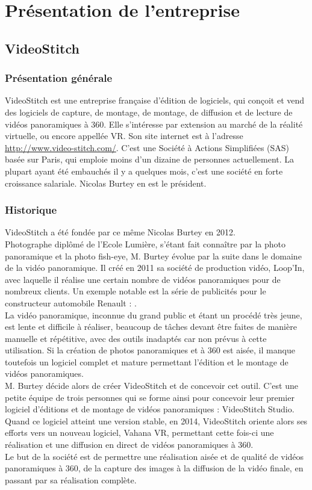 \chapter{Présentation de l'entreprise}
\section{VideoStitch}
\subsection{Présentation générale}
VideoStitch est une entreprise française d'édition de logiciels, qui conçoit et vend des logiciels de capture, de montage, de montage, de diffusion et de lecture de vidéos panoramiques à 360\°. Elle s'intéresse par extension au marché de la réalité virtuelle, ou encore appellée VR.
Son site internet est à l'adresse \url{http://www.video-stitch.com/}.
C'est une Société à Actions Simplifiées (SAS) basée sur Paris, qui emploie moins d'un dizaine de personnes actuellement. 
La plupart ayant été embauchés il y a quelques mois, c'est une société en forte croissance salariale. 
Nicolas Burtey en est le président.

\subsection{Historique}
VideoStitch a été fondée par ce même Nicolas Burtey en 2012.\\
Photographe diplômé de l'Ecole Lumière, s'étant fait connaître par la photo panoramique et la photo fish-eye, M. Burtey évolue par la suite dans le domaine de la vidéo panoramique. 
Il créé en 2011 sa société de production vidéo, Loop'In, avec laquelle il réalise une certain nombre de vidéos panoramiques pour de nombreux clients.
Un exemple notable est la série de publicités pour le constructeur automobile Renault : \url{}.\\
La vidéo panoramique, inconnue du grand public et étant un procédé très jeune, est lente et difficile à réaliser, beaucoup de tâches devant être faites de manière manuelle et répétitive, avec des outils inadaptés car non prévus à cette utilisation.
Si la création de photos panoramiques et à 360\° est aisée, il manque toutefois un logiciel complet et mature permettant l'édition et le montage de vidéos panoramiques.\\
M. Burtey décide alors de créer VideoStitch et de concevoir cet outil. C'est une petite équipe de trois personnes qui se forme ainsi pour concevoir leur premier logiciel d'éditions et de montage de vidéos panoramiques : VideoStitch Studio.\\
Quand ce logiciel atteint une version stable, en 2014, VideoStitch oriente alors ses efforts vers un nouveau logiciel, Vahana VR, permettant cette fois-ci une réalisation et une diffusion en direct de vidéos panoramiques à 360\°.\\
\newline
Le but de la société est de permettre une réalisation aisée et de qualité de vidéos panoramiques à 360\°, de la capture des images à la diffusion de la vidéo finale, en passant par sa réalisation complète.


